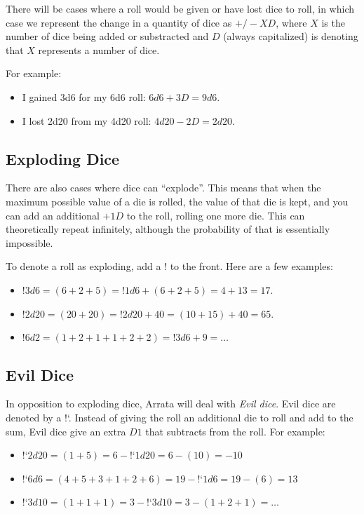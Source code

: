 \documentclass[../main.tex]{subfiles}
\begin{document}
    There will be cases where a roll would be given or have lost dice to roll, in which case we represent the change in a quantity of dice as $+/-XD$, where $X$ is the number of dice being added or substracted and $D$ (always capitalized) is denoting that $X$ represents a number of dice.

    For example:
    \begin{itemize}
        \item I gained 3d6 for my 6d6 roll: $6d6 + 3D = 9d6$.
        \item I lost 2d20 from my 4d20 roll: $4d20 - 2D = 2d20$.
    \end{itemize}

    \subsection{Exploding Dice}

    There are also cases where dice can ``explode''. This means that when the maximum possible value of a die is rolled, the value of that die is kept, and you can add an additional $+1D$ to the roll, rolling one more die. This can theoretically repeat infinitely, although the probability of that is essentially impossible.

    To denote a roll as exploding, add a $!$ to the front. Here are a few examples:

    \begin{itemize}
        \item $!3d6 = (6 + 2 + 5) = !1d6 + (6 + 2 + 5) = 4 + 13 = 17$.
        \item $!2d20 = (20 + 20) = !2d20 + 40 = (10 + 15) + 40 = 65$.
        \item $!6d2 = (1 + 2 + 1 + 1 + 2 + 2) = !3d6 + 9 = \dots$
    \end{itemize}

    \subsection{Evil Dice}

    In opposition to exploding dice, Arrata will deal with {\em Evil dice}. Evil dice are denoted by a !`. Instead of giving the roll an additional die to roll and add to the sum, Evil dice give an extra $D1$ that subtracts from the roll. For example:

    \begin{itemize}
        \item!`$2d20 = (1 + 5) = 6 - $!`$1d20 = 6 - (10) = -10$
        \item!`$6d6 = (4 + 5 + 3 + 1 + 2 + 6) = 19 - $!`$1d6 = 19 - (6) = 13$
        \item!`$3d10 = (1 + 1 + 1) = 3 - $!`$3d10 = 3 - (1 + 2 + 1) = \dots$
    \end{itemize}
\end{document}
